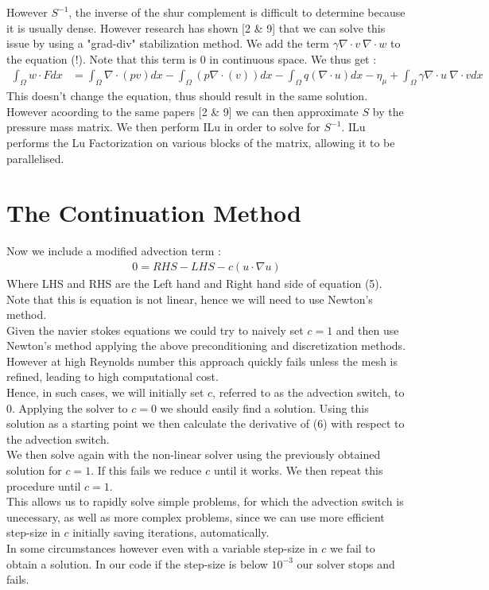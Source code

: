 \documentclass[11pt,twoside,a4paper]{article}
\begin{document}
 However $S^{-1}$, the inverse of the shur complement is difficult to determine because it is usually dense. However research has shown [2 \& 9] that we can solve this issue by using a "grad-div" stabilization method. We add the term $\gamma \nabla \cdot v \: \nabla \cdot w$ to the equation (!). Note that this term is 0 in continuous space. We thus get : 
\begin{align}
\int_\Omega w \cdot F dx &= \int_\Omega \nabla \cdot (p v) dx - \int_\Omega ( p \nabla \cdot (v)) dx - \int_\Omega q (\nabla \cdot u) dx  - \eta_\mu + \int_\Omega \gamma \nabla \cdot u \: \nabla \cdot v dx
\end{align}
This doesn't change the equation, thus should result in the same solution. However acoording to the same papers [2 \& 9] we can then approximate $S$ by the pressure mass matrix. We then perform ILu in order to solve for $S^{-1}$. ILu performs the Lu Factorization on various blocks of the matrix, allowing it to be parallelised.

\section{The Continuation Method}
Now we include a modified advection term : 
\begin{align}
0 = RHS - LHS - c ( u \cdot \nabla u) 
\end{align}
Where LHS and RHS are the Left hand and Right hand side of equation (5). Note that this is equation is not linear, hence we will need to use Newton's method.\\ 
Given the navier stokes equations we could try to naively set $c = 1$ and then use Newton's method applying the above preconditioning and discretization methods. However at high Reynolds number this approach quickly fails unless the mesh is refined, leading to high computational cost.\\
Hence, in such cases, we will initially set $c$, referred to as the advection switch, to $0$. Applying the solver to $c = 0$ we should easily find a solution. Using this solution as a starting point we then calculate the derivative of (6) with respect to the advection switch.\\
We then solve again with the non-linear solver using the previously obtained solution for $c = 1$. If this fails we reduce $c$ until it works. We then repeat this procedure until $c = 1$.\\
 This allows us to rapidly solve simple problems, for which the advection switch is unecessary, as well as more complex problems, since we can use more efficient step-size in $c$ initially saving iterations, automatically.\\
In some circumstances however even with a variable step-size in $c$ we fail to obtain a solution. In our code if the step-size is below $10^{-3}$ our solver stops and fails.
\end{document}

